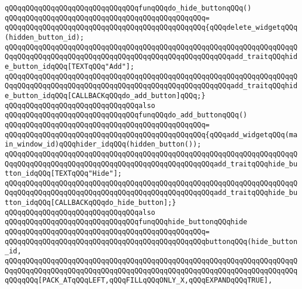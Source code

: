 \newline
\verb|qQQqqQQqqQQqqQQqqQQqqQQqqQQqqQQqfunqQQqdo_hide_buttonqQQq()|\newline
\verb|qQQqqQQqqQQqqQQqqQQqqQQqqQQqqQQqqQQqqQQqqQQqqQQq=|\newline
\verb|qQQqqQQqqQQqqQQqqQQqqQQqqQQqqQQqqQQqqQQqqQQqqQQq{qQQqdelete_widgetqQQq(hidden_button_id);|\newline
\verb|qQQqqQQqqQQqqQQqqQQqqQQqqQQqqQQqqQQqqQQqqQQqqQQqqQQqqQQqqQQqqQQqqQQqqQQqqQQqqQQqqQQqqQQqqQQqqQQqqQQqqQQqqQQqqQQqqQQqqQQqqQQqadd_traitqQQqhide_button_idqQQq[TEXTqQQq"Add"];|\newline
\verb|qQQqqQQqqQQqqQQqqQQqqQQqqQQqqQQqqQQqqQQqqQQqqQQqqQQqqQQqqQQqqQQqqQQqqQQqqQQqqQQqqQQqqQQqqQQqqQQqqQQqqQQqqQQqqQQqqQQqqQQqqQQqadd_traitqQQqhide_button_idqQQq[CALLBACKqQQqdo_add_button]qQQq;}|\newline
\newline
\verb|qQQqqQQqqQQqqQQqqQQqqQQqqQQqqQQqalso|\newline
\verb|qQQqqQQqqQQqqQQqqQQqqQQqqQQqqQQqfunqQQqdo_add_buttonqQQq()|\newline
\verb|qQQqqQQqqQQqqQQqqQQqqQQqqQQqqQQqqQQqqQQqqQQqqQQq=|\newline
\verb|qQQqqQQqqQQqqQQqqQQqqQQqqQQqqQQqqQQqqQQqqQQqqQQq{qQQqadd_widgetqQQq(main_window_id)qQQqhider_idqQQq(hidden_button());|\newline
\verb|qQQqqQQqqQQqqQQqqQQqqQQqqQQqqQQqqQQqqQQqqQQqqQQqqQQqqQQqqQQqqQQqqQQqqQQqqQQqqQQqqQQqqQQqqQQqqQQqqQQqqQQqqQQqqQQqqQQqqQQqadd_traitqQQqhide_button_idqQQq[TEXTqQQq"Hide"];|\newline
\verb|qQQqqQQqqQQqqQQqqQQqqQQqqQQqqQQqqQQqqQQqqQQqqQQqqQQqqQQqqQQqqQQqqQQqqQQqqQQqqQQqqQQqqQQqqQQqqQQqqQQqqQQqqQQqqQQqqQQqqQQqadd_traitqQQqhide_button_idqQQq[CALLBACKqQQqdo_hide_button];}|\newline
\newline
\verb|qQQqqQQqqQQqqQQqqQQqqQQqqQQqqQQqalso|\newline
\verb|qQQqqQQqqQQqqQQqqQQqqQQqqQQqqQQqfunqQQqhide_buttonqQQqhide|\newline
\verb|qQQqqQQqqQQqqQQqqQQqqQQqqQQqqQQqqQQqqQQqqQQqqQQq=|\newline
\verb|qQQqqQQqqQQqqQQqqQQqqQQqqQQqqQQqqQQqqQQqqQQqqQQqbuttonqQQq(hide_button_id,|\newline
\verb|qQQqqQQqqQQqqQQqqQQqqQQqqQQqqQQqqQQqqQQqqQQqqQQqqQQqqQQqqQQqqQQqqQQqqQQqqQQqqQQqqQQqqQQqqQQqqQQqqQQqqQQqqQQqqQQqqQQqqQQqqQQqqQQqqQQqqQQqqQQqqQQqqQQq[PACK_ATqQQqLEFT,qQQqFILLqQQqONLY_X,qQQqEXPANDqQQqTRUE],|\newline
